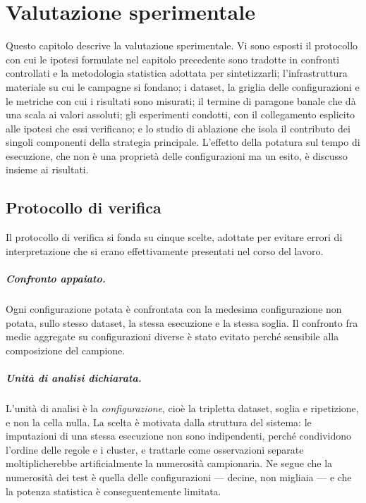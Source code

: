 \chapter{Valutazione sperimentale}\label{chap:experiments}


\noindent Questo capitolo descrive la valutazione sperimentale. Vi sono esposti il protocollo con
cui le ipotesi formulate nel capitolo precedente sono tradotte in confronti controllati e la
metodologia statistica adottata per sintetizzarli; l'infrastruttura materiale su cui le campagne
si fondano; i dataset, la griglia delle configurazioni e le metriche con cui i risultati sono
misurati; il termine di paragone banale che dà una scala ai valori assoluti; gli esperimenti
condotti, con il collegamento esplicito alle ipotesi che essi verificano; e lo studio di ablazione
che isola il contributo dei singoli componenti della strategia principale. L'effetto della
potatura sul tempo di esecuzione, che non è una proprietà delle configurazioni ma un esito, è
discusso insieme ai risultati.

\section{Protocollo di verifica}\label{sec:verification}

Il protocollo di verifica si fonda su cinque scelte, adottate per evitare errori di
interpretazione che si erano effettivamente presentati nel corso del lavoro.

\paragraph{Confronto appaiato.} Ogni configurazione potata è confrontata con la medesima
configurazione non potata, sullo stesso dataset, la stessa esecuzione e la stessa soglia. Il
confronto fra medie aggregate su configurazioni diverse è stato evitato perché sensibile alla
composizione del campione.

\paragraph{Unità di analisi dichiarata.} L'unità di analisi è la \emph{configurazione}, cioè la
tripletta dataset, soglia e ripetizione, e non la cella nulla. La scelta è motivata dalla
struttura del sistema: le imputazioni di una stessa esecuzione non sono indipendenti, perché
condividono l'ordine delle regole e i cluster, e trattarle come osservazioni separate
moltiplicherebbe artificialmente la numerosità campionaria. Ne segue che la numerosità dei test è
quella delle configurazioni --- decine, non migliaia --- e che la potenza statistica è
conseguentemente limitata.

